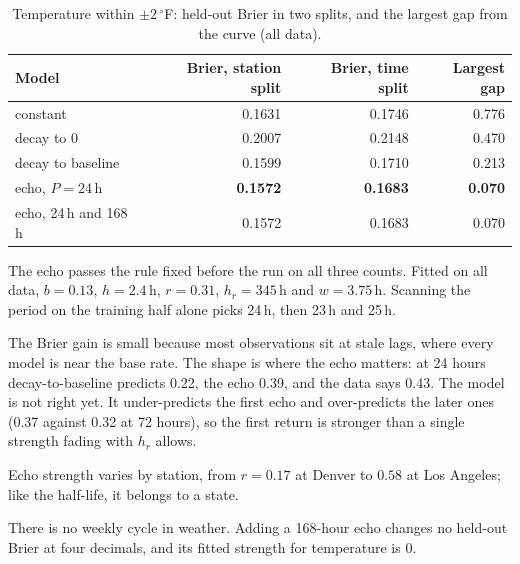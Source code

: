 \begin{table}[t]
\centering
\small
\caption{Temperature within $\pm 2\,^\circ$F: held-out Brier in two splits,
and the largest gap from the curve (all data).}
\label{tab:echo}
\begin{tabular}{lrrr}
\toprule
Model & Brier, station split & Brier, time split & Largest gap \\
\midrule
constant & 0.1631 & 0.1746 & 0.776 \\
decay to 0 & 0.2007 & 0.2148 & 0.470 \\
decay to baseline & 0.1599 & 0.1710 & 0.213 \\
echo, $P = 24$\,h & \textbf{0.1572} & \textbf{0.1683} & \textbf{0.070} \\
echo, 24\,h and 168\,h & 0.1572 & 0.1683 & 0.070 \\
\bottomrule
\end{tabular}
\end{table}

The echo passes the rule fixed before the run on all three counts. Fitted
on all data, $b = 0.13$, $h = 2.4$\,h, $r = 0.31$, $h_r = 345$\,h and
$w = 3.75$\,h. Scanning the period on the training half alone picks 24\,h,
then 23\,h and 25\,h.

The Brier gain is small because most observations sit at stale lags, where
every model is near the base rate. The shape is where the echo matters: at
24 hours decay-to-baseline predicts 0.22, the echo 0.39, and the data says
0.43. The model is not right yet. It under-predicts the first echo and
over-predicts the later ones (0.37 against 0.32 at 72 hours), so the first
return is stronger than a single strength fading with $h_r$ allows.

Echo strength varies by station, from $r = 0.17$ at Denver to $0.58$ at Los
Angeles; like the half-life, it belongs to a state.

There is no weekly cycle in weather. Adding a 168-hour echo changes no
held-out Brier at four decimals, and its fitted strength for temperature
is 0.

